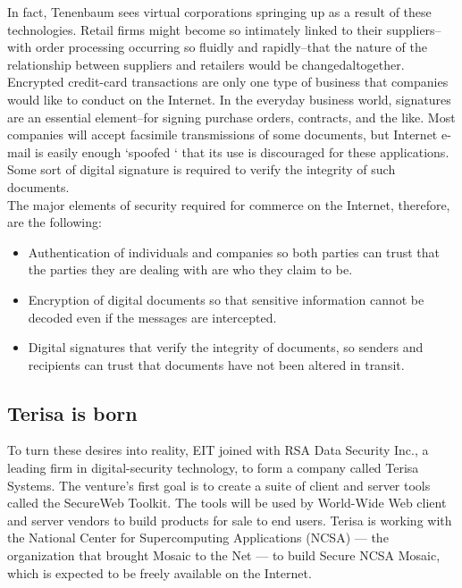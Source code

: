 In fact, Tenenbaum sees virtual corporations springing up as a result
of these technologies. Retail firms might become so intimately linked
to their suppliers--with order processing occurring so fluidly and
rapidly--that the nature of the relationship between suppliers and
retailers would be changedaltogether.\\

Encrypted credit-card transactions are only one type of business that
companies would like to conduct on the Internet. In the everyday
business world, signatures are an essential element--for signing
purchase orders, contracts, and the like. Most companies will accept
facsimile transmissions of some documents, but Internet e-mail is
easily enough `spoofed ` that its use is discouraged for these
applications. Some sort of digital signature is required to verify the
integrity of such documents.\\

The major elements of security required for commerce on the Internet,
therefore, are the following:
\begin{itemize}
  \item Authentication of individuals and companies so both parties can
    trust that the parties they are dealing with are who they claim to be.
  \item Encryption of digital documents so that sensitive information
    cannot be decoded even if the messages are intercepted.
  \item Digital signatures that verify the integrity of documents, so
    senders and recipients can trust that documents have not been altered
    in transit.
\end{itemize}

\subsection{Terisa is born}
To turn these desires into reality, EIT joined with RSA Data Security
Inc., a leading firm in digital-security technology, to form a company
called Terisa Systems. The venture's first goal is to create a suite of
client and server tools called the SecureWeb Toolkit. The tools will be
used by World-Wide Web client and server vendors to build products for
sale to end users. Terisa is working with the National Center for
Supercomputing Applications (NCSA) --- the organization that brought
Mosaic to the Net --- to build Secure NCSA Mosaic, which is expected to be
freely available on the Internet.\\

